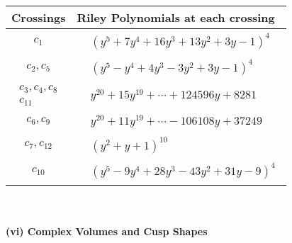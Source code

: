 \documentclass[1p]{elsarticle_modified}
\theoremstyle{definition}
\begin{document}
\begin{tabular}{m{50pt}|m{274pt}}
Crossings & \hspace{64pt}Riley Polynomials at each crossing \\
\hline $$\begin{aligned}c_{1}\end{aligned}$$&$\begin{aligned}
&(y^5+7 y^4+16 y^3+13 y^2+3 y-1)^4
\end{aligned}$\\
\hline $$\begin{aligned}c_{2},c_{5}\end{aligned}$$&$\begin{aligned}
&(y^5- y^4+4 y^3-3 y^2+3 y-1)^4
\end{aligned}$\\
\hline $$\begin{aligned}c_{3},c_{4},c_{8}\\c_{11}\end{aligned}$$&$\begin{aligned}
&y^{20}+15 y^{19}+\cdots+124596 y+8281
\end{aligned}$\\
\hline $$\begin{aligned}c_{6},c_{9}\end{aligned}$$&$\begin{aligned}
&y^{20}+11 y^{19}+\cdots-106108 y+37249
\end{aligned}$\\
\hline $$\begin{aligned}c_{7},c_{12}\end{aligned}$$&$\begin{aligned}
&(y^2+y+1)^{10}
\end{aligned}$\\
\hline $$\begin{aligned}c_{10}\end{aligned}$$&$\begin{aligned}
&(y^5-9 y^4+28 y^3-43 y^2+31 y-9)^4
\end{aligned}$\\
\hline
\end{tabular}\\~\\
\newpage\flushleft \textbf{(vi) Complex Volumes and Cusp Shapes}
\end{document}
